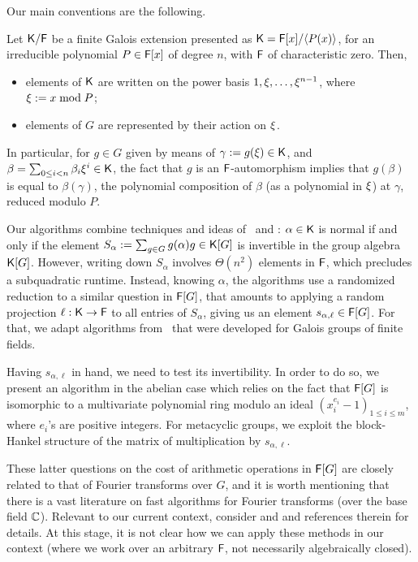 Our main conventions are the following.
\begin{assumption}
  \label{assum}
  Let ${\mathsf{K}}/{\mathsf{F}}$ be a finite Galois extension presented as
  ${\mathsf{K}}={\mathsf{F}}[x]/\langle P(x)\rangle$, for an irreducible polynomial $P\in
  {\mathsf{F}}[x]$ of degree $n$, with ${\mathsf{F}}$ of characteristic zero. Then,
  \begin{itemize}
  \item elements of ${\mathsf{K}}$ are written on the power basis $1,\xi,\dots,\xi^{n-1}$,
    where $\xi := x \bmod P$;
  \item elements of $G$ are represented by their action on $\xi$.
  \end{itemize}
\end{assumption}

In particular, for $g \in G$ given by means of $\gamma:=g(\xi) \in {\mathsf{K}}$,
and $\beta = \sum_{0\leq i<n}\beta_i\xi^i\in{\mathsf{K}}$, the fact that $g$ is an
${\mathsf{F}}$-automorphism implies that $g(\beta)$ is equal to $\beta(\gamma)$, the
polynomial composition of $\beta$ (as a polynomial in $\xi$) at $\gamma$,
reduced modulo $P$.

Our algorithms combine techniques and ideas of~\cite{GatGie90} and
\cite{KalSho98}: $\alpha \in {\mathsf{K}}$ is normal if and only if the element
$S_\alpha := \sum_{g \in G} g(\alpha)g \in {\mathsf{K}}[G]$ is invertible in the
group algebra ${\mathsf{K}}[G]$.  However, writing down $S_\alpha$ involves
$\Theta(n^2)$ elements in ${\mathsf{F}}$, which precludes a subquadratic
runtime. Instead, knowing $\alpha$, the algorithms use a randomized
reduction to a similar question in ${\mathsf{F}}[G]$, that amounts to applying a
random projection $\ell:{\mathsf{K}}\to{\mathsf{F}}$ to all entries of $S_\alpha$, giving
us an element $s_{\alpha,\ell} \in {\mathsf{F}}[G]$. For that, we adapt
algorithms from~\citep{KalSho98} that were developed for Galois groups
of finite fields.

Having $s_{\alpha,\ell}$ in hand, we need to test its
invertibility. In order to do so, we present an algorithm in the
abelian case which relies on the fact that ${\mathsf{F}}[G]$ is isomorphic to a
multivariate polynomial ring modulo an ideal $(x^{e_i}_i-1)_{1 \leq i
  \leq m}$, where $e_i$'s are positive integers. For metacyclic
groups, we exploit the block-Hankel structure of the matrix of
multiplication by $s_{\alpha,\ell}$. 

These latter questions on the cost of arithmetic operations in ${\mathsf{F}}[G]$
are closely related to that of Fourier transforms over $G$, and it is
worth mentioning that there is a vast literature on fast algorithms
for Fourier transforms (over the base field $\mathbb{C}$). Relevant to our
current context, consider \citep{ClaMu04} and \citep{MaRockWol18} and
references therein for details. At this stage, it is not clear how we
can apply these methods in our context (where we work over an
arbitrary ${\mathsf{F}}$, not necessarily algebraically closed).

